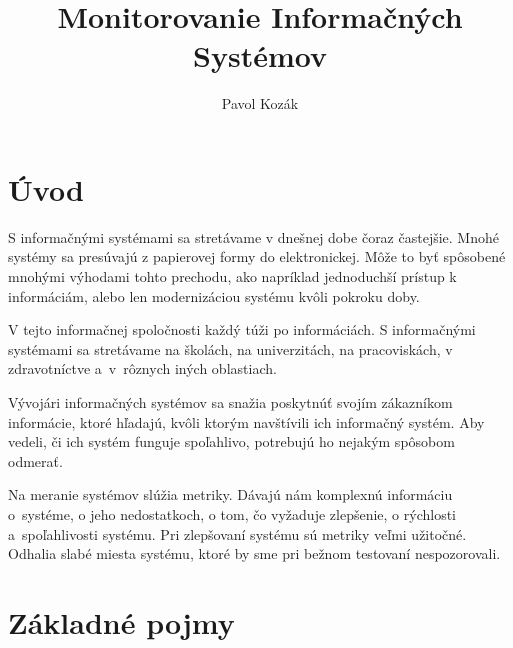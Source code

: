 \documentclass[a4paper, upjsfrontpage, disablespecwarning, thesismargins, thesislinespacing]{rnthesis}
\title{Monitorovanie Informačných Systémov}
\author{Pavol Kozák}
\begin{document}
\maketitle
\newpage

\setcounter{tocdepth}{2}
\tableofcontents

\newpage


\chapter*{Úvod}

S informačnými systémami sa stretávame v dnešnej dobe čoraz častejšie. 
Mnohé systémy sa presúvajú z papierovej formy do elektronickej.
Môže to byť spôsobené mnohými výhodami tohto prechodu, ako napríklad jednoduchší prístup k informáciám, alebo len modernizáciou systému kvôli pokroku doby.

V tejto informačnej spoločnosti každý túži po informáciách.
S informačnými systémami sa stretávame na školách, na univerzitách, na pracoviskách, v zdravot\-níc\-tve a~v~rôznych iných oblastiach.

Vývojári informačných systémov sa snažia poskytnúť svojím zákazníkom informácie, ktoré hľadajú, kvôli ktorým navštívili ich informačný systém.
Aby vedeli, či ich systém funguje spoľahlivo, potrebujú ho nejakým spôsobom odmerať.

Na meranie systémov slúžia metriky.
Dávajú nám komplexnú informáciu o~systéme, o jeho nedostatkoch, o tom, čo vyžaduje zlepšenie, o rýchlosti a~spoľahli\-vos\-ti systému.
Pri zlepšovaní systému sú metriky veľmi užitočné.
Odhalia slabé miesta systému, ktoré by sme pri bežnom testovaní nespozorovali.


\chapter{Základné pojmy}

\end{document}
